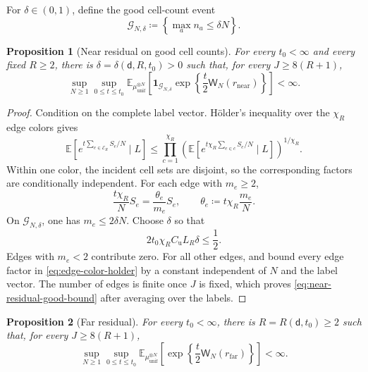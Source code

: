 \documentclass[11pt,reqno]{amsart}
\numberwithin{equation}{section}
\theoremstyle{plain}
\newtheorem{prop}[prop]{Proposition}
\theoremstyle{definition}
\renewcommand{\d}{\mathsf d}
\newcommand{\E}{\mathbb E}
\newcommand{\one}{\mathbf 1}
\newcommand{\muunif}{\mu_{\mathrm{unif}}}
\begin{document}
For $\delta\in(0,1)$, define the good cell-count event
\begin{equation}
 \mathcal G_{N,\delta}
 \coloneqq\left\{\max_a n_a\leq\delta N\right\}.
 \label{eq:good-occupancy-event}
\end{equation}

\begin{prop}[Near residual on good cell counts]
\label{prop:near-residual-good}
For every $t_0<\infty$ and every fixed $R\geq2$, there is $\delta=\delta(\d,R,t_0)>0$ such that, for every $J\geq8(R+1)$,
\begin{equation}
 \sup_{N\geq1}\sup_{0\leq t\leq t_0}
 \E_{\muunif^{\otimes N}}\left[
 \one_{\mathcal G_{N,\delta}}
 \exp\left\{\frac t2\mathsf W_N(r_{\mathrm{near}})\right\}\right]
 <\infty.
 \label{eq:near-residual-good-bound}
\end{equation}
\end{prop}

\begin{proof}
Condition on the complete label vector.  H\"older's inequality over the $\chi_R$ edge colors gives
\begin{equation}
 \E\left[e^{t\sum_{e\in\mathcal E_R}S_e/N}\mid L\right]
 \leq\prod_{c=1}^{\chi_R}
 \left(\E\left[e^{t\chi_R\sum_{e\in c}S_e/N}\mid L\right]\right)^{1/\chi_R}.
 \label{eq:edge-color-holder}
\end{equation}
Within one color, the incident cell sets are disjoint, so the corresponding factors are conditionally independent.  For each edge with $m_e\geq2$,
\begin{equation}
 \frac{t\chi_R}{N}S_e
 =\frac{\theta_e}{m_e}S_e,
 \qquad
 \theta_e\coloneqq t\chi_R\frac{m_e}{N}.
 \label{eq:local-temperature-identity}
\end{equation}
On $\mathcal G_{N,\delta}$, one has $m_e\leq2\delta N$.  Choose $\delta$ so that
\begin{equation}
 2t_0\chi_R C_{\mathrm u}L_R\delta\leq\frac12.
 \label{eq:delta-choice-near}
\end{equation}
Edges with $m_e<2$ contribute zero. For all other edges,  and  bound every edge factor in \eqref{eq:edge-color-holder} by a constant independent of $N$ and the label vector.  The number of edges is finite once $J$ is fixed, which proves \eqref{eq:near-residual-good-bound} after averaging over the labels.
\end{proof}

\begin{prop}[Far residual]
\label{prop:far-residual}
For every $t_0<\infty$, there is $R=R(\d,t_0)\geq2$ such that, for every $J\geq8(R+1)$,
\begin{equation}
 \sup_{N\geq1}\sup_{0\leq t\leq t_0}
 \E_{\muunif^{\otimes N}}\left[
 \exp\left\{\frac t2\mathsf W_N(r_{\mathrm{far}})\right\}\right]
 <\infty.
 \label{eq:far-residual-bound}
\end{equation}
\end{prop}
\end{document}
